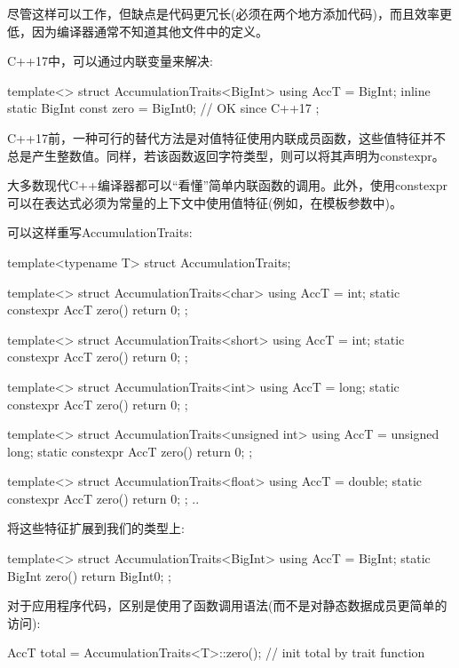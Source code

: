 尽管这样可以工作，但缺点是代码更冗长(必须在两个地方添加代码)，而且效率更低，因为编译器通常不知道其他文件中的定义。

C++17中，可以通过内联变量来解决:

\begin{cpp}
template<>
struct AccumulationTraits<BigInt> {
	using AccT = BigInt;
	inline static BigInt const zero = BigInt{0}; // OK since C++17
};
\end{cpp}

C++17前，一种可行的替代方法是对值特征使用内联成员函数，这些值特征并不总是产生整数值。同样，若该函数返回字符类型，则可以将其声明为constexpr。

\begin{notice}大多数现代C++编译器都可以“看懂”简单内联函数的调用。此外，使用constexpr可以在表达式必须为常量的上下文中使用值特征(例如，在模板参数中)。
\end{notice}

可以这样重写AccumulationTraits:

\begin{cpp}
template<typename T>
struct AccumulationTraits;

template<>
struct AccumulationTraits<char> {
	using AccT = int;
	static constexpr AccT zero() {
		return 0;
	}
};

template<>
struct AccumulationTraits<short> {
	using AccT = int;
	static constexpr AccT zero() {
		return 0;
	}
};

template<>
struct AccumulationTraits<int> {
	using AccT = long;
	static constexpr AccT zero() {
		return 0;
	}
};

template<>
struct AccumulationTraits<unsigned int> {
	using AccT = unsigned long;
	static constexpr AccT zero() {
		return 0;
	}
};

template<>
struct AccumulationTraits<float> {
	using AccT = double;
	static constexpr AccT zero() {
		return 0;
	}
};
..
\end{cpp}

将这些特征扩展到我们的类型上:

\begin{cpp}
template<>
struct AccumulationTraits<BigInt> {
	using AccT = BigInt;
	static BigInt zero() {
		return BigInt{0};
	}
};
\end{cpp}

对于应用程序代码，区别是使用了函数调用语法(而不是对静态数据成员更简单的访问):

\begin{cpp}
AccT total = AccumulationTraits<T>::zero(); // init total by trait function
\end{cpp}

